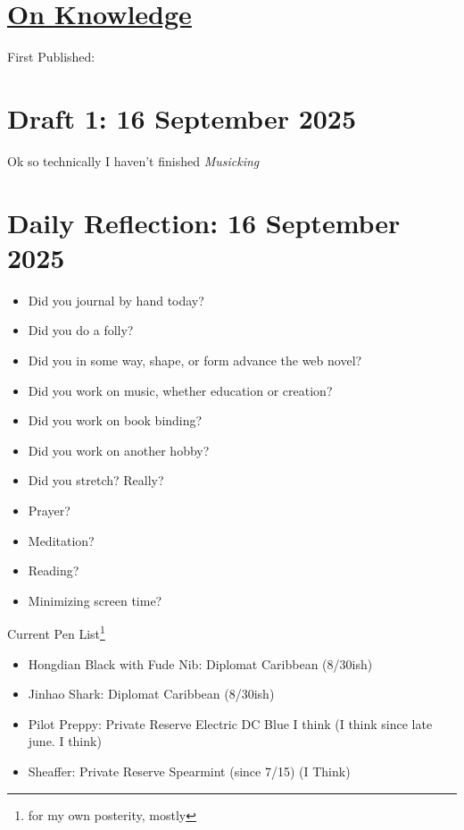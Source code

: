 \documentclass[12pt]{article}
\renewcommand{\,}{\textsuperscript{,}}
\begin{document}
  
\doublespacing  
\section{\href{knowledge.html}{On Knowledge}}  
First Published: 

\section{Draft 1: 16 September 2025}
Ok so technically I haven't finished \textit{Musicking}



\section{Daily Reflection: 16 September 2025}

\begin{itemize}

\item Did you journal by hand today?

\item Did you do a folly?

\item Did you in some way, shape, or form advance the web novel?

\item Did you work on music, whether education or creation?

\item Did you work on book binding?

\item Did you work on another hobby?

\item Did you stretch? Really?

\item Prayer?

\item Meditation?

\item Reading?

\item Minimizing screen time?

\end{itemize}

Current Pen List\footnote{for my own posterity, mostly}

\begin{itemize}  
\item Hongdian Black with Fude Nib: Diplomat Caribbean (8/30ish)  
\item Jinhao Shark: Diplomat Caribbean (8/30ish)  
\item Pilot Preppy: Private Reserve Electric DC Blue I think (I think since late june. I think)  
\item Sheaffer: Private Reserve Spearmint (since 7/15) (I Think)
\end{itemize}
\end{document}

